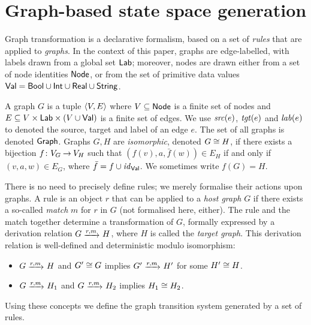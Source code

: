 \section{Graph-based state space generation}

Graph transformation is a declarative formalism, based on a set of \emph{rules}
that are applied to \emph{graphs}. In the context of this paper, graphs are
edge-labelled, with labels drawn from a global set $\mathsf{Lab}$; moreover, nodes are
drawn either from a set of node identities $\mathsf{Node}$, or from the set of
primitive data values $\mathsf{Val}=\mathsf{Bool}\cup \mathsf{Int}\cup \mathsf{Real}\cup \mathsf{String}$.

\begin{definition}
  A graph $G$ is a tuple ${\langle V,E \rangle}$ where $V\subseteq \mathsf{Node}$ is a finite set
  of nodes and $E\subseteq V\times \mathsf{Lab}\times (V\cup \mathsf{Val})$ is a finite set of
  edges. We use $\mathit{src}(e)$, $\mathit{tgt}(e)$ and $\mathit{lab}(e)$ to denoted the source,
  target and label of an edge $e$. The set of all graphs is denoted $\mathsf{Graph}$.
  Graphs $G,H$ are \emph{isomorphic}, denoted $G\cong H$, if there exists a
  bijection $f\colon {V_G} \mathbin{\rightarrow} {V_H}$ such that $(f(v),a,\bar f(w))\in E_H$ if and
  only if $(v,a,w)\in E_G$, where $\bar f=f\cup{\mathit{id}}_{\mathsf{Val}}$. We sometimes write
  $f(G)=H$.
\end{definition}
%
There is no need to precisely define rules; we merely formalise their actions
upon graphs. A rule is an object $r$ that can be applied to a \emph{host graph}
$G$ if there exists a so-called \emph{match} $m$ for $r$ in $G$ (not formalised
here, either).  The rule and the match together determine a transformation of
$G$, formally expressed by a derivation relation $G\trans{r,m} H$, where $H$ is
called the \emph{target graph}. This derivation relation is well-defined and
deterministic modulo isomorphism:

\begin{itemize}\noitemsep
\item $G\trans{r,m} H$ and $G'\cong G$ implies $G'\trans{r,m} H'$ for some
  $H'\cong H$.
\item $G\trans{r,m} H_1$ and $G\trans{r,m} H_2$ implies $H_1\cong H_2$.
\end{itemize}
%
Using these concepts we define the graph transition system
generated by a set of rules.

